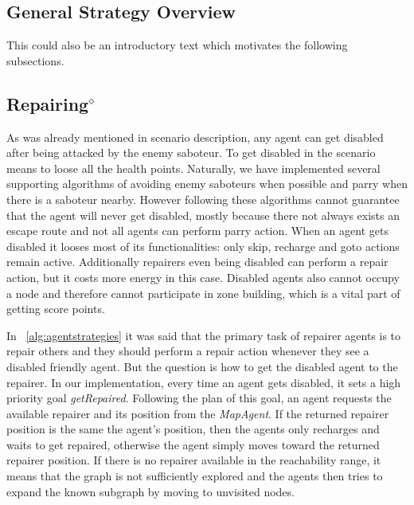 \subsection{General Strategy Overview}
This could also be an introductory text which motivates the following subsections.



\subsection[Repairing]{Repairing$^\diamond$}\label{alg:repairing}
As was already mentioned in scenario description, any agent can get disabled after being attacked by the enemy saboteur. To get disabled in the scenario means to loose all the health points. Naturally, we have implemented several supporting algorithms of avoiding enemy saboteurs when possible and parry when there is a saboteur nearby. However following these algorithms cannot guarantee that the agent will never get disabled, mostly because there not always exists an escape route and not all agents can perform parry action. When an agent gets disabled it looses most of its functionalities: only skip, recharge and goto actions remain active. Additionally repairers even being disabled can perform a repair action, but it costs more energy in this case. Disabled agents also cannot occupy a node and therefore cannot participate in zone building, which is a vital part of getting score points.

In ~\autoref{alg:agentstrategies} it was said that the primary task of repairer agents is to repair others and they should perform a repair action whenever they see a disabled friendly agent. But the question is how to get the disabled agent to the repairer. In our implementation, every time an agent gets disabled, it sets a high priority goal \emph{getRepaired}. Following the plan of this goal, an agent requests the available repairer and its position from the \emph{MapAgent}. If the returned repairer position is the same the agent's position, then the agents only recharges and waits to get repaired, otherwise the agent simply moves toward the returned repairer position. If there is no repairer available in the reachability range, it means that the graph is not sufficiently explored and the agents then tries to expand the known subgraph by moving to unvisited nodes.

